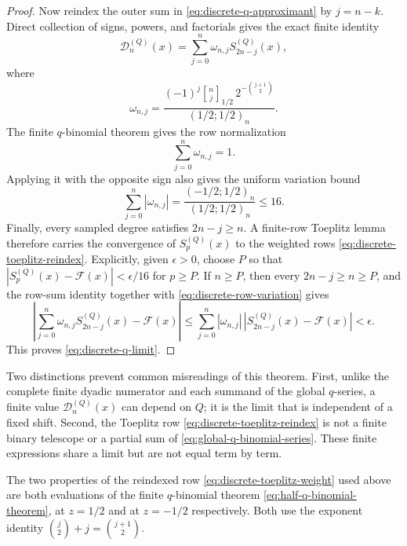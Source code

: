 \documentclass[11pt,oneside]{article}
\theoremstyle{definition}
\theoremstyle{remark}
\newcommand{\qbinom}[3]{\genfrac{[}{]}{0pt}{}{#1}{#2}_{#3}}
\begin{document}
\begin{proof}
Now reindex the outer sum in \eqref{eq:discrete-q-approximant} by $j=n-k$.  Direct
collection of signs, powers, and factorials gives the exact finite identity
\begin{equation}
 \mathcal D_n^{(Q)}(x)=
 \sum_{j=0}^{n}\omega_{n,j}S_{2n-j}^{(Q)}(x),             \label{eq:discrete-toeplitz-reindex}
\end{equation}
where
\begin{equation}
 \omega_{n,j}=
 \frac{(-1)^j\qbinom nj{1/2}\,2^{-\binom{j+1}{2}}}
 {(1/2;1/2)_n}.                                          \label{eq:discrete-toeplitz-weight}
\end{equation}
The finite $q$-binomial theorem gives the row normalization
\begin{equation}
 \sum_{j=0}^{n}\omega_{n,j}=1.                            \label{eq:discrete-row-sum}
\end{equation}
Applying it with the opposite sign also gives the uniform variation bound
\begin{equation}
 \sum_{j=0}^{n}|\omega_{n,j}|
 =\frac{(-1/2;1/2)_n}{(1/2;1/2)_n}\le16.                 \label{eq:discrete-row-variation}
\end{equation}
Finally, every sampled degree satisfies $2n-j\ge n$.  A finite-row Toeplitz lemma therefore
carries the convergence of $S_p^{(Q)}(x)$ to the weighted rows
\eqref{eq:discrete-toeplitz-reindex}.  Explicitly, given $\epsilon>0$, choose $P$ so that
$|S_p^{(Q)}(x)-\mathcal F(x)|<\epsilon/16$ for $p\ge P$.  If $n\ge P$, then every
$2n-j\ge n\ge P$, and the row-sum identity together with
\eqref{eq:discrete-row-variation} gives
\begin{equation*}
 \left|\sum_{j=0}^{n}\omega_{n,j}S_{2n-j}^{(Q)}(x)-\mathcal F(x)\right|
 \le\sum_{j=0}^{n}|\omega_{n,j}|\,
 |S_{2n-j}^{(Q)}(x)-\mathcal F(x)|<\epsilon.
\end{equation*}
This proves \eqref{eq:discrete-q-limit}.
\end{proof}

Two distinctions prevent common misreadings of this theorem.  First, unlike the complete
finite dyadic numerator and each summand of the global $q$-series, a finite value
$\mathcal D_n^{(Q)}(x)$ can depend on $Q$; it is the limit that is independent of a fixed
shift.  Second, the Toeplitz row \eqref{eq:discrete-toeplitz-reindex} is not a finite binary
telescope or a partial sum of \eqref{eq:global-q-binomial-series}.  These finite expressions
share a limit but are not equal term by term.

The two properties of the reindexed row \eqref{eq:discrete-toeplitz-weight} used above are
both evaluations of the finite $q$-binomial theorem \eqref{eq:half-q-binomial-theorem}, at
$z=1/2$ and at $z=-1/2$ respectively.  Both use the exponent identity
$\binom j2+j=\binom{j+1}2$.
\end{document}

